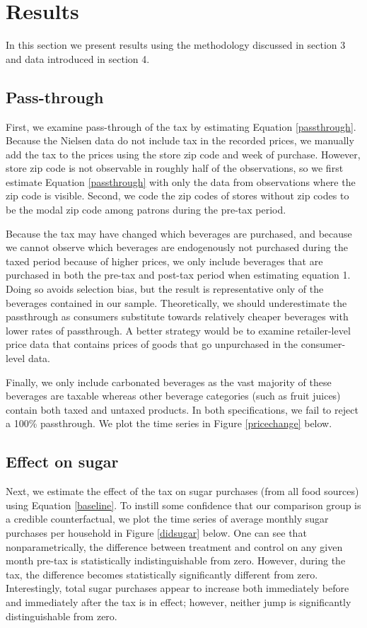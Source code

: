 \documentclass[12pt]{article}
\begin{document}
\section{Results} \label{results}
In this section we present results using the methodology discussed in section 3 and data introduced in section 4.

\subsection{Pass-through}

First, we examine pass-through of the tax by estimating Equation \ref{passthrough}. Because the Nielsen data do not include tax in the recorded prices, we manually add the tax to the prices using the store zip code and week of purchase. However, store zip code is not observable in roughly half of the observations, so we first estimate Equation \ref{passthrough} with only the data from observations where the zip code is visible. Second, we code the zip codes of stores without zip codes to be the modal zip code among patrons during the pre-tax period.

Because the tax may have changed which beverages are purchased, and because we cannot observe which beverages are endogenously not purchased during the taxed period because of higher prices, we only include beverages that are purchased in both the pre-tax and post-tax period when estimating equation 1. Doing so avoids selection bias, but the result is representative only of the beverages contained in our sample. Theoretically, we should underestimate the passthrough as consumers substitute towards relatively cheaper beverages with lower rates of passthrough. A better strategy would be to examine retailer-level price data that contains prices of goods that go unpurchased in the consumer-level data.

Finally, we only include carbonated beverages as the vast majority of these beverages are taxable whereas other beverage categories (such as fruit juices) contain both taxed and untaxed products. In both specifications, we fail to reject a 100\% passthrough. We plot the time series in Figure \ref{pricechange} below.

\subsection{Effect on sugar}

Next, we estimate the effect of the tax on sugar purchases (from all food sources) using Equation \ref{baseline}. To instill some confidence that our comparison group is a credible counterfactual, we plot the time series of average monthly sugar purchases per household in Figure \ref{didsugar} below. One can see that nonparametrically, the difference between treatment and control on any given month pre-tax is statistically indistinguishable from zero. However, during the tax, the difference becomes statistically significantly different from zero. Interestingly, total sugar purchases appear to increase both immediately before and immediately after the tax is in effect; however, neither jump is significantly distinguishable from zero.
\end{document}
